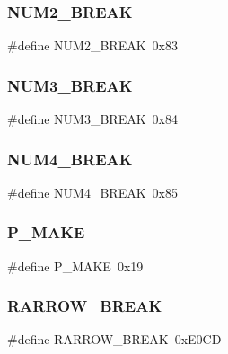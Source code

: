 \subsubsection{\texorpdfstring{N\+U\+M2\+\_\+\+B\+R\+E\+AK}{NUM2\_BREAK}}
{\footnotesize\ttfamily \#define N\+U\+M2\+\_\+\+B\+R\+E\+AK~0x83}

\hypertarget{group__scancodes_ga2b19345612635fb7cc2774bf1d18bbcd}{}\label{group__scancodes_ga2b19345612635fb7cc2774bf1d18bbcd} 
\subsubsection{\texorpdfstring{N\+U\+M3\+\_\+\+B\+R\+E\+AK}{NUM3\_BREAK}}
{\footnotesize\ttfamily \#define N\+U\+M3\+\_\+\+B\+R\+E\+AK~0x84}

\hypertarget{group__scancodes_ga10d66972ee092e45e01d18921164ef72}{}\label{group__scancodes_ga10d66972ee092e45e01d18921164ef72} 
\subsubsection{\texorpdfstring{N\+U\+M4\+\_\+\+B\+R\+E\+AK}{NUM4\_BREAK}}
{\footnotesize\ttfamily \#define N\+U\+M4\+\_\+\+B\+R\+E\+AK~0x85}

\hypertarget{group__scancodes_gace8d1d82b15ad6363a0026421bc87fd6}{}\label{group__scancodes_gace8d1d82b15ad6363a0026421bc87fd6} 
\subsubsection{\texorpdfstring{P\+\_\+\+M\+A\+KE}{P\_MAKE}}
{\footnotesize\ttfamily \#define P\+\_\+\+M\+A\+KE~0x19}

\hypertarget{group__scancodes_ga9dd5fb482207f2c4f76696b443f76020}{}\label{group__scancodes_ga9dd5fb482207f2c4f76696b443f76020} 
\subsubsection{\texorpdfstring{R\+A\+R\+R\+O\+W\+\_\+\+B\+R\+E\+AK}{RARROW\_BREAK}}
{\footnotesize\ttfamily \#define R\+A\+R\+R\+O\+W\+\_\+\+B\+R\+E\+AK~0x\+E0\+CD}

